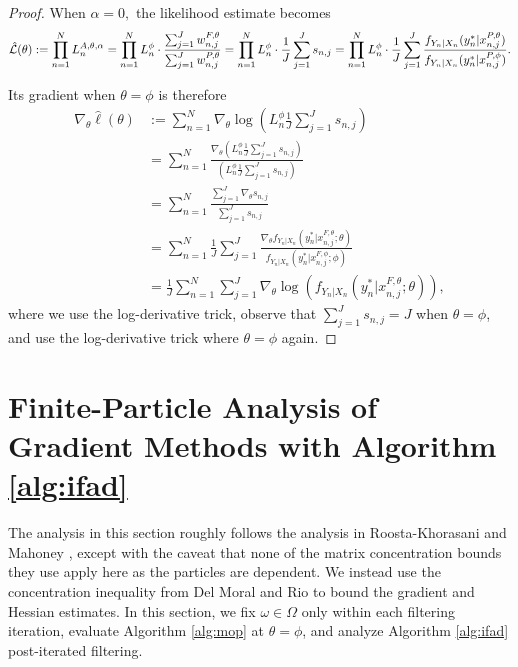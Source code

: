\documentclass{article}
\begin{document}
\begin{proof}
    When $\alpha=0,$ the likelihood estimate becomes
\begin{equation}
    \hat{\mathcal{L}}(\theta) := \prod_{n=1}^N L_n^{A, \theta, \alpha} = \prod_{n=1}^N L_n^\phi \cdot \frac{\sum_{j=1}^J w_{n,j}^{F,\theta}}{\sum_{j=1}^J w_{n,j}^{P,\theta}} = \prod_{n=1}^N L_n^\phi \cdot \frac{1}{J}\sum_{j=1}^J s_{n,j} = \prod_{n=1}^N L_n^\phi \cdot \frac{1}{J}\sum_{j=1}^J \frac{f_{Y_n|X_n}(y_n^*|x_{n,j}^{P, \theta})}{f_{Y_n|X_n}(y_n^*|x_{n,j}^{P, \phi})}.
\end{equation}

Its gradient when $\theta=\phi$ is therefore 
\begin{align*}
    \nabla_\theta \hat{\ell}(\theta) &:= \sum_{n=1}^N \nabla_\theta \log\left(L_n^\phi \frac{1}{J} \sum_{j=1}^J s_{n,j}\right) \\
    &= \sum_{n=1}^N \frac{\nabla_\theta \left(L_n^\phi \frac{1}{J} \sum_{j=1}^J s_{n,j}\right)}{\left(L_n^\phi \frac{1}{J} \sum_{j=1}^J s_{n,j}\right)} \\
    &= \sum_{n=1}^N \frac{\sum_{j=1}^J \nabla_\theta s_{n,j}}{\sum_{j=1}^J s_{n,j}} \\
    &= \sum_{n=1}^N \frac{1}{J} \sum_{j=1}^J \frac{\nabla_\theta f_{Y_n|X_{n}}(y_n^*|x_{n,j}^{F, \theta}; \theta)}{f_{Y_n|X_{n}}(y_n^*|x_{n,j}^{F, \phi}; \phi)} \\
    &= \frac{1}{J} \sum_{n=1}^N \sum_{j=1}^J \nabla_\theta \log\left(f_{Y_n|X_{n}}(y_n^*|x_{n,j}^{F, \theta}; \theta)\right),
\end{align*}
where we use the log-derivative trick, observe that $\sum_{j=1}^J s_{n,j} = J$ when $\theta=\phi$, and use the log-derivative trick where $\theta=\phi$ again. 
\end{proof}


\section{Finite-Particle Analysis of Gradient Methods with Algorithm \ref{alg:ifad}}
\label{app:ifad}

The analysis in this section roughly follows the analysis in Roosta-Khorasani and Mahoney \cite{mahoney2016subsampled}, except with the caveat that none of the matrix concentration bounds they use apply here as the particles are dependent. We instead use the concentration inequality from Del Moral and Rio \cite{delmoral2011ci} to bound the gradient and Hessian estimates. In this section, we fix $\omega \in \Omega$ only within each filtering iteration, evaluate Algorithm \ref{alg:mop} at $\theta=\phi$, and analyze Algorithm \ref{alg:ifad} post-iterated filtering.
\end{document}
